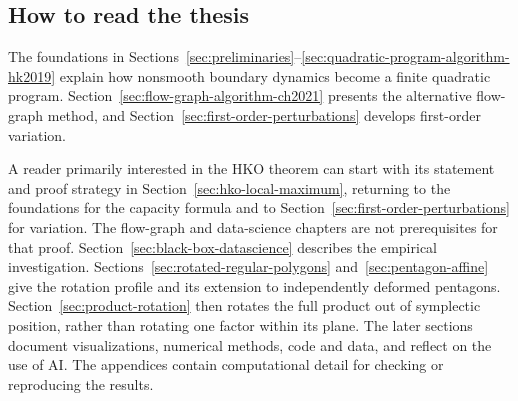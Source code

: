 \subsection{How to read the thesis}

The foundations in Sections~\ref{sec:preliminaries}--\ref{sec:quadratic-program-algorithm-hk2019}
explain how nonsmooth boundary dynamics become a finite quadratic program.
Section~\ref{sec:flow-graph-algorithm-ch2021} presents the alternative flow-graph
method, and Section~\ref{sec:first-order-perturbations} develops first-order variation.

A reader primarily interested in the HKO theorem can start with its statement
and proof strategy in Section~\ref{sec:hko-local-maximum}, returning to the
foundations for the capacity formula and to
Section~\ref{sec:first-order-perturbations} for variation. The flow-graph and
data-science chapters are not prerequisites for that proof.
Section~\ref{sec:black-box-datascience} describes the empirical investigation.
Sections~\ref{sec:rotated-regular-polygons} and~\ref{sec:pentagon-affine} give
the rotation profile and its extension to independently deformed pentagons.
Section~\ref{sec:product-rotation} then rotates the full product out of
symplectic position, rather than rotating one factor within its plane.
The later sections document visualizations, numerical methods, code and data,
and reflect on the use of AI. The appendices contain computational detail
for checking or reproducing the results.

